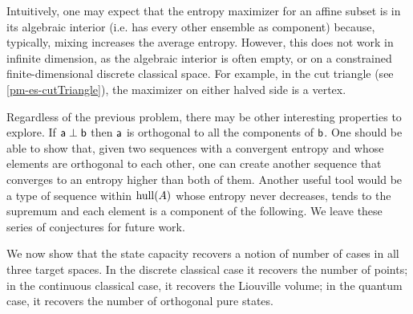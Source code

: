 Intuitively, one may expect that the entropy maximizer for an affine subset is in its algebraic interior (i.e. has every other ensemble as component) because, typically, mixing increases the average entropy. However, this does not work in infinite dimension, as the algebraic interior is often empty, or on a constrained finite-dimensional discrete classical space. For example, in the cut triangle (see \ref{pm-es-cutTriangle}), the maximizer on either halved side is a vertex.

Regardless of the previous problem, there may be other interesting properties to explore. If $\ens[a] \ortho \ens[b]$ then $\ens[a]$ is orthogonal to all the components of $\ens[b]$. One should be able to show that, given two sequences with a convergent entropy and whose elements are orthogonal to each other, one can create another sequence that converges to an entropy higher than both of them. Another useful tool would be a type of sequence within $\hull(A)$ whose entropy never decreases, tends to the supremum and each element is a component of the following. We leave these series of conjectures for future work.

We now show that the state capacity recovers a notion of number of cases in all three target spaces. In the discrete classical case it recovers the number of points; in the continuous classical case, it recovers the Liouville volume; in the quantum case, it recovers the number of orthogonal pure states.


